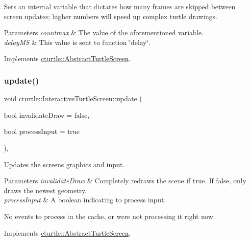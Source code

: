 Sets an internal variable that dictates how many frames are skipped between screen updates; higher numbers will speed up complex turtle drawings. 
\begin{DoxyParams}{Parameters}
{\em countmax} & The value of the aforementioned variable. \\
\hline
{\em delay\+MS} & This value is sent to function \char`\"{}delay\char`\"{}. \\
\hline
\end{DoxyParams}


Implements \hyperlink{classcturtle_1_1AbstractTurtleScreen}{cturtle\+::\+Abstract\+Turtle\+Screen}.

\mbox{\label{classcturtle_1_1InteractiveTurtleScreen_adfefb43645347feb832072f8fc8da144}} 
\subsubsection{\texorpdfstring{update()}{update()}}
{\footnotesize\ttfamily void cturtle\+::\+Interactive\+Turtle\+Screen\+::update (\begin{DoxyParamCaption}\item[{bool}]{invalidate\+Draw = {\ttfamily false},  }\item[{bool}]{process\+Input = {\ttfamily true} }\end{DoxyParamCaption})\hspace{0.3cm}{\ttfamily [inline]}, {\ttfamily [virtual]}}

Updates the screen\textquotesingle{}s graphics and input. 
\begin{DoxyParams}{Parameters}
{\em invalidate\+Draw} & Completely redraws the scene if true. If false, only draws the newest geometry. \\
\hline
{\em process\+Input} & A boolean indicating to process input. \\
\hline
\end{DoxyParams}
No events to process in the cache, or we\textquotesingle{}re not processing it right now. 

Implements \hyperlink{classcturtle_1_1AbstractTurtleScreen}{cturtle\+::\+Abstract\+Turtle\+Screen}.

\mbox{\label{classcturtle_1_1InteractiveTurtleScreen_a259883332b284e3b8a97b5bfb74f988d}} 
